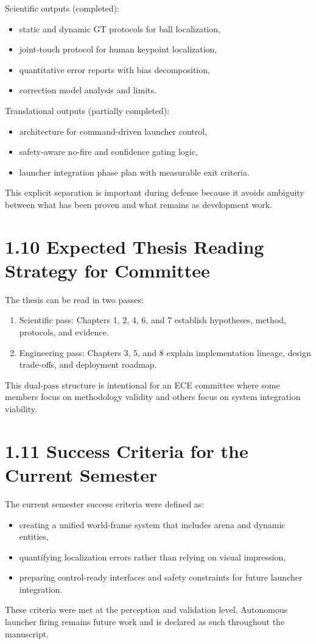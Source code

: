 Scientific outputs (completed):
\begin{itemize}
  \item static and dynamic GT protocols for ball localization,
  \item joint-touch protocol for human keypoint localization,
  \item quantitative error reports with bias decomposition,
  \item correction model analysis and limits.
\end{itemize}

Translational outputs (partially completed):
\begin{itemize}
  \item architecture for command-driven launcher control,
  \item safety-aware no-fire and confidence gating logic,
  \item launcher integration phase plan with measurable exit criteria.
\end{itemize}

This explicit separation is important during defense because it avoids ambiguity between what has been proven and what remains as development work.

\section{1.10 Expected Thesis Reading Strategy for Committee}
The thesis can be read in two passes:

\begin{enumerate}
  \item Scientific pass: Chapters 1, 2, 4, 6, and 7 establish hypotheses, method, protocols, and evidence.
  \item Engineering pass: Chapters 3, 5, and 8 explain implementation lineage, design trade-offs, and deployment roadmap.
\end{enumerate}

This dual-pass structure is intentional for an ECE committee where some members focus on methodology validity and others focus on system integration viability.

\section{1.11 Success Criteria for the Current Semester}
The current semester success criteria were defined as:
\begin{itemize}
  \item creating a unified world-frame system that includes arena and dynamic entities,
  \item quantifying localization errors rather than relying on visual impression,
  \item preparing control-ready interfaces and safety constraints for future launcher integration.
\end{itemize}

These criteria were met at the perception and validation level. Autonomous launcher firing remains future work and is declared as such throughout the manuscript.
